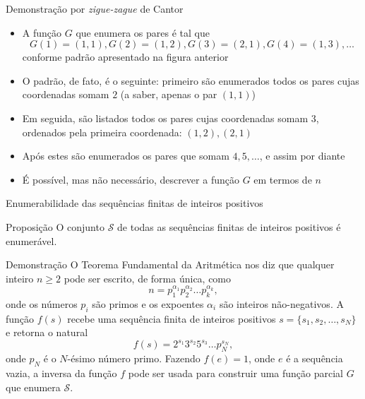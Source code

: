 \begin{frame}[fragile]{Demonstração por {\it zigue-zague} de Cantor} 

    \begin{itemize}
        \item A função $G$ que enumera os pares é tal que 
        \[
            G(1) = (1, 1), G(2) = (1, 2), G(3) = (2, 1), G(4) = (1, 3), \ldots
        \]
        conforme padrão apresentado na figura anterior

        \item O padrão, de fato, é o seguinte: primeiro são enumerados todos os pares cujas
            coordenadas somam $2$ (a saber, apenas o par $(1, 1)$)

        \item Em seguida, são listados todos os pares cujas coordenadas somam $3$, ordenados
            pela primeira coordenada: $(1, 2), (2, 1)$

        \item Após estes são enumerados os pares que somam $4, 5, \ldots$, e assim por diante

        \item É possível, mas não necessário, descrever a função $G$ em termos de $n$
    \end{itemize}

\end{frame}

\begin{frame}[fragile]{Enumerabilidade das sequências finitas de inteiros positivos}

    \begin{block}{Proposição}
        O conjunto $\mathcal{S}$ de todas as sequências finitas de inteiros positivos é enumerável.
    \end{block}

    \begin{block}{Demonstração}
        O Teorema Fundamental da Aritmética nos diz que qualquer inteiro $n\geq 2$ pode ser 
        escrito, de forma única, como
        \[
            n = p_1^{\alpha_1}p_2^{\alpha_2}\ldots p_k^{\alpha_k},
        \]
        onde os números $p_i$ são primos e os expoentes $\alpha_i$ são inteiros não-negativos.
        A função $f(s)$ recebe uma sequência finita de inteiros positivos 
        $s = \lbrace s_1, s_2, \ldots, s_N\rbrace$ e retorna o natural
        \[
            f(s) = 2^{s_1}3^{s_2}5^{s_3}\ldots p_N^{s_N},
        \]
        onde $p_N$ é o $N$-ésimo número primo. 
        Fazendo $f(e) = 1$, onde $e$ é a sequência vazia, a inversa da função $f$ pode ser usada
        para construir uma função parcial $G$ que enumera $\mathcal{S}$.
    \end{block}
    
\end{frame}

